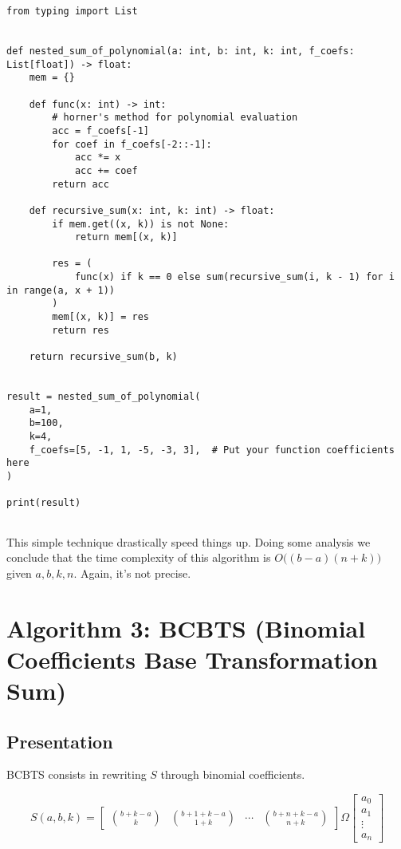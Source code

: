 \documentclass[12pt]{article}
\begin{document}
\begin{lstlisting}[style=Python]
from typing import List


def nested_sum_of_polynomial(a: int, b: int, k: int, f_coefs: List[float]) -> float:
    mem = {}

    def func(x: int) -> int:
        # horner's method for polynomial evaluation
        acc = f_coefs[-1]
        for coef in f_coefs[-2::-1]:
            acc *= x
            acc += coef
        return acc

    def recursive_sum(x: int, k: int) -> float:
        if mem.get((x, k)) is not None:
            return mem[(x, k)]

        res = (
            func(x) if k == 0 else sum(recursive_sum(i, k - 1) for i in range(a, x + 1))
        )
        mem[(x, k)] = res
        return res

    return recursive_sum(b, k)


result = nested_sum_of_polynomial(
    a=1,
    b=100,
    k=4,
    f_coefs=[5, -1, 1, -5, -3, 3],  # Put your function coefficients here
)

print(result)
    
\end{lstlisting}

This simple technique drastically speed things up. Doing some analysis we conclude that the time complexity of this algorithm is $O\Big((b - a)(n + k)\Big)$ given $a, b, k, n$. Again, it's not precise.

\section{Algorithm 3: BCBTS (Binomial Coefficients Base Transformation Sum)}

\subsection{Presentation}

BCBTS consists in rewriting $S$ through binomial coefficients.

$$
    S(a, b, k) = \begin{bmatrix}
        \binom{b+k-a}{k} & \binom{b+1+k-a}{1+k} & \cdots & \binom{b+n+k-a}{n+k}
    \end{bmatrix} \Omega
    \begin{bmatrix}
        a_0 \\ a_1 \\ \vdots \\ a_n
    \end{bmatrix}
$$
\end{document}
